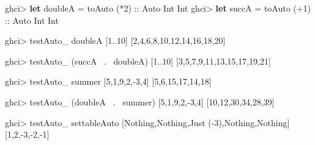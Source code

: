 \documentclass[]{article}
\newenvironment{Shaded}{}{}
\newcommand{\KeywordTok}[1]{\textcolor[rgb]{0.00,0.44,0.13}{\textbf{{#1}}}}
\newcommand{\DataTypeTok}[1]{\textcolor[rgb]{0.56,0.13,0.00}{{#1}}}
\newcommand{\DecValTok}[1]{\textcolor[rgb]{0.25,0.63,0.44}{{#1}}}
\newcommand{\OtherTok}[1]{\textcolor[rgb]{0.00,0.44,0.13}{{#1}}}
\newcommand{\FunctionTok}[1]{\textcolor[rgb]{0.02,0.16,0.49}{{#1}}}
\newcommand{\NormalTok}[1]{{#1}}
\begin{document}
\begin{Shaded}
\begin{Highlighting}[]
\NormalTok{ghci}\FunctionTok{>} \KeywordTok{let} \NormalTok{doubleA  }\FunctionTok{=} \NormalTok{toAuto (}\FunctionTok{*}\DecValTok{2}\NormalTok{)}\OtherTok{      ::} \DataTypeTok{Auto} \DataTypeTok{Int} \DataTypeTok{Int}
\NormalTok{ghci}\FunctionTok{>} \KeywordTok{let} \NormalTok{succA    }\FunctionTok{=} \NormalTok{toAuto (}\FunctionTok{+}\DecValTok{1}\NormalTok{)}\OtherTok{      ::} \DataTypeTok{Auto} \DataTypeTok{Int} \DataTypeTok{Int}

\NormalTok{ghci}\FunctionTok{>} \NormalTok{testAuto_ doubleA [}\DecValTok{1}\FunctionTok{..}\DecValTok{10}\NormalTok{]}
\NormalTok{[}\DecValTok{2}\NormalTok{,}\DecValTok{4}\NormalTok{,}\DecValTok{6}\NormalTok{,}\DecValTok{8}\NormalTok{,}\DecValTok{10}\NormalTok{,}\DecValTok{12}\NormalTok{,}\DecValTok{14}\NormalTok{,}\DecValTok{16}\NormalTok{,}\DecValTok{18}\NormalTok{,}\DecValTok{20}\NormalTok{]}

\NormalTok{ghci}\FunctionTok{>} \NormalTok{testAuto_ (succA }\FunctionTok{~.~} \NormalTok{doubleA) [}\DecValTok{1}\FunctionTok{..}\DecValTok{10}\NormalTok{]}
\NormalTok{[}\DecValTok{3}\NormalTok{,}\DecValTok{5}\NormalTok{,}\DecValTok{7}\NormalTok{,}\DecValTok{9}\NormalTok{,}\DecValTok{11}\NormalTok{,}\DecValTok{13}\NormalTok{,}\DecValTok{15}\NormalTok{,}\DecValTok{17}\NormalTok{,}\DecValTok{19}\NormalTok{,}\DecValTok{21}\NormalTok{]}

\NormalTok{ghci}\FunctionTok{>} \NormalTok{testAuto_ summer [}\DecValTok{5}\NormalTok{,}\DecValTok{1}\NormalTok{,}\DecValTok{9}\NormalTok{,}\DecValTok{2}\NormalTok{,}\FunctionTok{-}\DecValTok{3}\NormalTok{,}\DecValTok{4}\NormalTok{]}
\NormalTok{[}\DecValTok{5}\NormalTok{,}\DecValTok{6}\NormalTok{,}\DecValTok{15}\NormalTok{,}\DecValTok{17}\NormalTok{,}\DecValTok{14}\NormalTok{,}\DecValTok{18}\NormalTok{]}

\NormalTok{ghci}\FunctionTok{>} \NormalTok{testAuto_ (doubleA }\FunctionTok{~.~} \NormalTok{summer) [}\DecValTok{5}\NormalTok{,}\DecValTok{1}\NormalTok{,}\DecValTok{9}\NormalTok{,}\DecValTok{2}\NormalTok{,}\FunctionTok{-}\DecValTok{3}\NormalTok{,}\DecValTok{4}\NormalTok{]}
\NormalTok{[}\DecValTok{10}\NormalTok{,}\DecValTok{12}\NormalTok{,}\DecValTok{30}\NormalTok{,}\DecValTok{34}\NormalTok{,}\DecValTok{28}\NormalTok{,}\DecValTok{39}\NormalTok{]}

\NormalTok{ghci}\FunctionTok{>} \NormalTok{testAuto_ settableAuto [}\DataTypeTok{Nothing}\NormalTok{,}\DataTypeTok{Nothing}\NormalTok{,}\DataTypeTok{Just} \NormalTok{(}\FunctionTok{-}\DecValTok{3}\NormalTok{),}\DataTypeTok{Nothing}\NormalTok{,}\DataTypeTok{Nothing}\NormalTok{]}
\NormalTok{[}\DecValTok{1}\NormalTok{,}\DecValTok{2}\NormalTok{,}\FunctionTok{-}\DecValTok{3}\NormalTok{,}\FunctionTok{-}\DecValTok{2}\NormalTok{,}\FunctionTok{-}\DecValTok{1}\NormalTok{]}


\end{Highlighting}
\end{Shaded}
\end{document}
